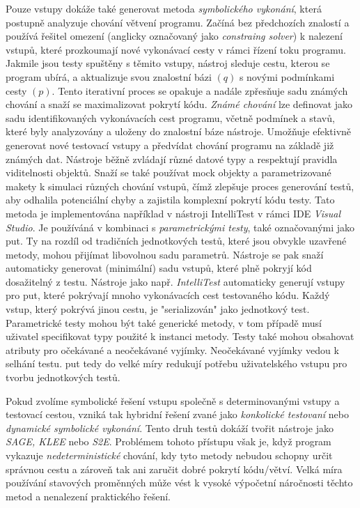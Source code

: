 \documentclass[czech, ma, kiv, he, iso690alph, pdf, viewonly]{fasthesis}
\begin{document}
        Pouze vstupy dokáže také generovat metoda \textit{symbolického vykonání}, která postupně analyzuje chování větvení programu. Začíná bez předchozích znalostí a používá řešitel omezení (anglicky označovaný jako \textit{constraing solver}) k nalezení vstupů, které prozkoumají nové vykonávací cesty v rámci řízení toku programu. Jakmile jsou testy spuštěny s těmito vstupy, nástroj sleduje cestu, kterou se program ubírá, a aktualizuje svou znalostní bázi \((q)\) s novými podmínkami cesty \((p)\). Tento iterativní proces se opakuje a nadále zpřesňuje sadu známých chování a snaží se maximalizovat pokrytí kódu. \textit{Známé chování} lze definovat jako sadu identifikovaných vykonávacích cest programu, včetně podmínek a stavů, které byly analyzovány a uloženy do znalostní báze nástroje. Umožňuje efektivně generovat nové testovací vstupy a předvídat chování programu na základě již známých dat. Nástroje běžně zvládají různé datové typy a respektují pravidla viditelnosti objektů. Snaží se také používat mock objekty a parametrizované makety k simulaci různých chování vstupů, čímž zlepšuje proces generování testů, aby odhalila potenciální chyby a zajistila komplexní pokrytí kódu testy. \cite{parizek_symbolic_execution} Tato metoda je implementována například v nástroji IntelliTest v rámci IDE \textit{Visual Studio}. Je používáná v kombinaci s \emph{parametrickými testy}, také označovanými jako \acrshort{put}. Ty na rozdíl od tradičních jednotkových testů, které jsou obvykle uzavřené metody, mohou přijímat libovolnou sadu parametrů. Nástroje se pak snaží automaticky generovat (minimální) sadu vstupů, které plně pokryjí kód dosažitelný z testu. Nástroje jako např. \textit{IntelliTest} automaticky generují vstupy pro \acrshort{put}, které pokrývají mnoho vykonávacích cest testovaného kódu. Každý vstup, který pokrývá jinou cestu, je "serializován" jako jednotkový test. Parametrické testy mohou být také generické metody, v tom případě musí uživatel specifikovat typy použité k instanci metody. Testy také mohou obsahovat atributy pro očekávané a neočekávané vyjímky. Neočekávané vyjímky vedou k selhání testu. \acrshort{put} tedy do velké míry redukují potřebu uživatelského vstupu pro tvorbu jednotkových testů. \cite{IntelliTestInputGeneration2023} \cite{microsoft2023testgen}

        Pokud zvolíme symbolické řešení vstupu společně s determinovanými vstupy a testovací cestou, vzniká tak hybridní řešení zvané jako \emph{konkolické testovaní} nebo \emph{dynamické symbolické vykonání}. Tento druh testů dokáží tvořit nástroje jako \textit{SAGE, KLEE} nebo \textit{S2E}. Problémem tohoto přístupu však je, když program vykazuje \emph{nedeterministické} chování, kdy tyto metody nebudou schopny určit správnou cestu a zároveň tak ani zaručit dobré pokrytí kódu/větví. Velká míra používání stavových proměnných může vést k vysoké výpočetní náročnosti těchto metod a nenalezení praktického řešení. \cite{engler2006exe} \cite{sen2005cute} \cite{zhou2006safedrive}
\end{document}

